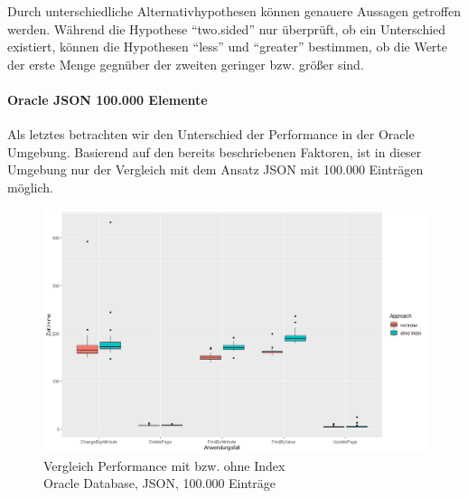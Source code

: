 \begin{table}[h]
\caption{P-Werte der Alternativhypothesen des Mann-Whitney-U-Tests für den Testaufbau Postgres, 1.000.000 Einträge, JSON; Vergleich mit Index gegenüber ohne Index}
\centering
{}
\label{tab:mw1mAlternative}
\end{table}

Durch unterschiedliche Alternativhypothesen können genauere Aussagen getroffen werden. Während die Hypothese ``two.sided'' nur überprüft, ob ein Unterschied existiert, können die Hypothesen ``less'' und ``greater'' bestimmen, ob die Werte der erste Menge gegnüber der zweiten geringer bzw. größer sind.

\paragraph{Oracle JSON 100.000 Elemente}

Als letztes betrachten wir den Unterschied der Performance in der Oracle Umgebung. Basierend auf den bereits beschriebenen Faktoren, ist in dieser Umgebung nur der Vergleich mit dem Ansatz JSON mit 100.000 Einträgen möglich.

\begin{figure}[H]
\centering
\includegraphics[scale=0.5]{rStudioPictures/oraclejson100kindex1100700.png}
\caption{Vergleich Performance mit bzw. ohne Index \\ Oracle Database, JSON, 100.000 Einträge}
\label{fig:oracle100kIndex}
\end{figure}

